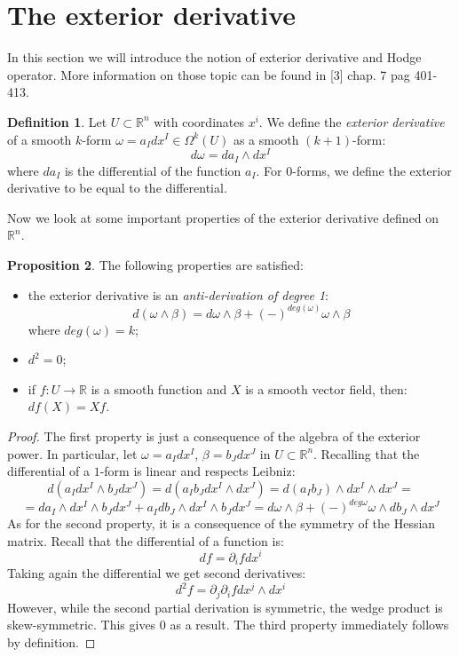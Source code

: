 \documentclass[12pt,a4paper]{report}
\theoremstyle{definition}
\newtheorem{Def}{Definition}[chapter]
\theoremstyle{Theorem}
\newtheorem{Prop}[Def]{Proposition}
\theoremstyle{definition}
\theoremstyle{definition}
\begin{document}
	\section{The exterior derivative}\label{Sec_1.7}
	In this section we will introduce the notion of exterior derivative and Hodge operator. More information on those topic can be found in [3] chap. 7 pag 401-413.
	\begin{Def}
		Let $U\subset \mathbb{R}^n$ with coordinates $x^i$. We define the \textit{exterior derivative} of a smooth $k$-form $\omega=a_Idx^I\in \Omega^k(U)$ as a smooth $(k+1)$-form:
		$$d\omega=da_I\wedge dx^I$$
		where $da_I$ is the differential of the function $a_I$. For 0-forms, we define the exterior derivative to be equal to the differential.
	\end{Def}
	Now we look at some important properties of the exterior derivative defined on $\mathbb{R}^n$.
	\begin{Prop}
		The following properties are satisfied:
		\begin{itemize}
			\item the exterior derivative is an \textit{anti-derivation of degree 1}: $$d(\omega\wedge\beta)=d\omega\wedge\beta+(-)^{deg(\omega)}\omega\wedge\beta$$
			where $deg(\omega)=k$;
			\item $d^2=0$;
			\item if $f:U\rightarrow \mathbb{R}$ is a smooth function and $X$ is a smooth vector field, then: $df(X)=Xf$.
		\end{itemize}
	\end{Prop}
	\begin{proof}
		The first property is just a consequence of the algebra of the exterior power. In particular, let $\omega=a_Idx^I$, $\beta=b_Jdx^J$ in $U\subset \mathbb{R}^n$. Recalling that the differential of a $1$-form is linear and respects Leibniz:
		$$d(a_Idx^I\wedge b_Jdx^J)=d(a_Ib_Jdx^I\wedge dx^J)=d(a_Ib_J)\wedge dx^I\wedge dx^J=$$
		$$=da_I\wedge dx^I\wedge b_Jdx^J+a_Idb_J\wedge dx^I\wedge b_Jdx^J=d\omega\wedge\beta+(-)^{deg\omega}\omega\wedge db_J\wedge dx^J$$
		As for the second property, it is a consequence of the symmetry of the Hessian matrix. Recall that the differential of a function is:
		$$df=\partial_ifdx^i$$
		Taking again the differential we get second derivatives:
		$$d^2f=\partial_j\partial_i f dx^j\wedge dx^i$$
		However, while the second partial derivation is symmetric, the wedge product is skew-symmetric. This gives 0 as a result. The third property immediately follows by definition.
	\end{proof}
\end{document}
